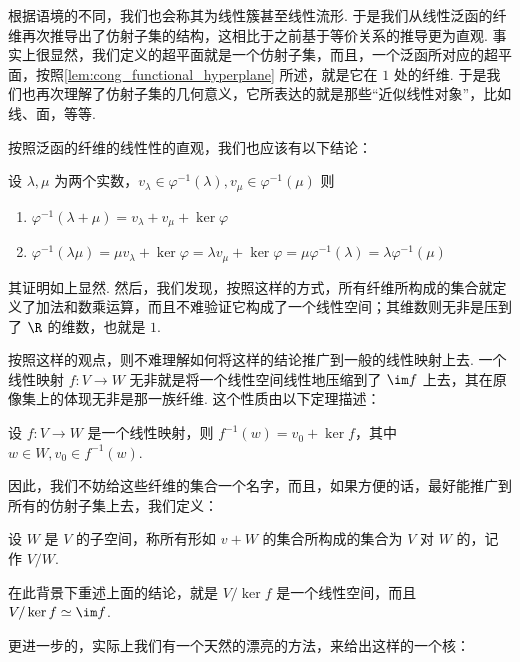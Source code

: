 根据语境的不同，我们也会称其为线性簇甚至线性流形. 于是我们从线性泛函的纤维再次推导出了仿射子集的结构，这相比于之前基于等价关系的推导更为直观. 事实上很显然，我们定义的超平面就是一个仿射子集，而且，一个泛函所对应的超平面，按照\autoref{lem:cong_functional_hyperplane} 所述，就是它在 $1$ 处的纤维. 于是我们也再次理解了仿射子集的几何意义，它所表达的就是那些``近似线性对象''，比如线、面，等等.

按照泛函的纤维的线性性的直观，我们也应该有以下结论：

\begin{lemma}{}{}
    设 $\lambda, \mu$ 为两个实数，$v_\lambda \in \varphi^{-1}(\lambda), v_\mu \in \varphi^{-1} (\mu)$ 则

    \begin{enumerate}
        \item $\varphi^{-1} (\lambda + \mu) = v_\lambda + v_\mu + \ker \varphi$
        \item $\varphi^{-1} (\lambda \mu) = \mu v_\lambda + \ker \varphi = \lambda v_\mu + \ker \varphi = \mu \varphi^{-1} (\lambda) = \lambda \varphi^{-1} (\mu)$
    \end{enumerate}
\end{lemma}

其证明如上显然. 然后，我们发现，按照这样的方式，所有纤维所构成的集合就定义了加法和数乘运算，而且不难验证它构成了一个线性空间；其维数则无非是压到了 $\R$ 的维数，也就是 $1$.

按照这样的观点，则不难理解如何将这样的结论推广到一般的线性映射上去. 一个线性映射 $f\colon V \to W$ 无非就是将一个线性空间线性地压缩到了 $\im f$ 上去，其在原像集上的体现无非是那一族纤维. 这个性质由以下定理描述：

\begin{theorem}{}{}
    设 $f\colon V \to W$ 是一个线性映射，则 $f^{-1} (w) = v_0 + \ker f$，其中 $w \in W, v_0 \in f^{-1} (w)$.
\end{theorem}

因此，我们不妨给这些纤维的集合一个名字，而且，如果方便的话，最好能推广到所有的仿射子集上去，我们定义：

\begin{definition}{}{}
    设 $W$ 是 $V$ 的子空间，称所有形如 $v + W$ 的集合所构成的集合为 $V$ 对 $W$ 的，记作 $V / W$.
\end{definition}

在此背景下重述上面的结论，就是 $V/\ker f$ 是一个线性空间，而且 $V/\ker f \simeq \im f$.

更进一步的，实际上我们有一个天然的漂亮的方法，来给出这样的一个核：

